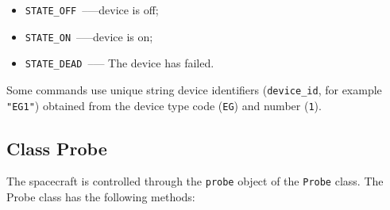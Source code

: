 \documentclass[12pt,a4paper]{article}
\begin{document}
\begin{itemize}
\item \verb'STATE_OFF'~--—device is off;
\item \verb'STATE_ON'~--—device is on;
\item \verb'STATE_DEAD'~--— The device has failed.
\end{itemize}

Some commands use unique string device identifiers
(\verb'device_id', for example \verb'"EG1"') obtained from the device type code (\verb'EG') and number (\verb'1').

\subsection*{Class Probe}

The spacecraft is controlled through the \verb'probe' object of the \verb'Probe' class. The Probe class has the following methods:
\end{document}
